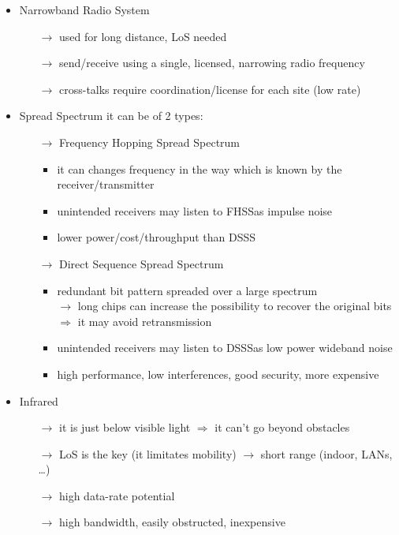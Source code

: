 \begin{itemize}
    \item Narrowband Radio System
    \begin{itemize}
        \item[$\rightarrow$] used for long distance, LoS needed
        \item[$\rightarrow$] send/receive using a single, licensed, narrowing radio frequency
        \item[$\rightarrow$] cross-talks require coordination/license for each site (low rate)
    \end{itemize}
    \item Spread Spectrum
    it can be of 2 types:
    \begin{itemize}
        \item[$\rightarrow$] Frequency Hopping Spread Spectrum
        \begin{itemize}
            \item it can changes frequency in the way which is known by the\\receiver/transmitter
            \item unintended receivers may listen to FHSS\footFHSS as impulse noise
            \item lower power/cost/throughput than DSSS\footDSSS
        \end{itemize}
        \item[$\rightarrow$] Direct Sequence Spread Spectrum
        \begin{itemize}
            \item redundant bit pattern spreaded over a large spectrum\\
            $\rightarrow$ long chips can increase the possibility to recover the original bits
            $\Rightarrow$ it may avoid retransmission
            \item unintended receivers may listen to DSSS\footDSSS as low power wideband noise
            \item high performance, low interferences, good security, more expensive
        \end{itemize}
    \end{itemize}
    \item Infrared
    \begin{itemize}
        \item[$\rightarrow$] it is just below visible light $\Rightarrow$ it can't go beyond obstacles
        \item[$\rightarrow$] LoS is the key (it limitates mobility) $\rightarrow$ short range (indoor, LANs, \dots)
        \item[$\rightarrow$] high data-rate potential
        \item[$\rightarrow$] high bandwidth, easily obstructed, inexpensive
    \end{itemize}
\end{itemize}
